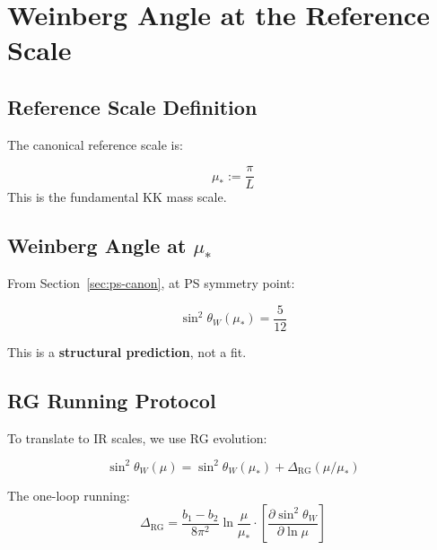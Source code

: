 \documentclass[11pt,a4paper]{article}
\begin{document}
\section{Weinberg Angle at the Reference Scale}
\label{sec:weinberg-angle}

\subsection{Reference Scale Definition}
\label{subsec:reference-scale}

The canonical reference scale is:

\begin{canonbox}
\label{box:reference-scale}
\begin{equation}
\label{eq:mu-star-def}
\boxed{\mu_* := \frac{\pi}{L}}
\end{equation}
This is the fundamental KK mass scale.
\end{canonbox}

\subsection{Weinberg Angle at $\mu_*$}
\label{subsec:weinberg-mu-star}

From Section~\ref{sec:ps-canon}, at PS symmetry point:

\begin{equation}
\label{eq:sin2-at-mustar}
\sin^2\theta_W(\mu_*) = \frac{5}{12}
\end{equation}

This is a \textbf{structural prediction}, not a fit.

\subsection{RG Running Protocol}
\label{subsec:rg-running}

To translate to IR scales, we use RG evolution:

\begin{equation}
\label{eq:rg-sin2}
\sin^2\theta_W(\mu) = \sin^2\theta_W(\mu_*) + \Delta_{\text{RG}}(\mu/\mu_*)
\end{equation}

The one-loop running:
\begin{equation}
\label{eq:delta-rg}
\Delta_{\text{RG}} = \frac{b_1 - b_2}{8\pi^2} \ln\frac{\mu}{\mu_*} \cdot \left[\frac{\partial \sin^2\theta_W}{\partial \ln\mu}\right]
\end{equation}
\end{document}
